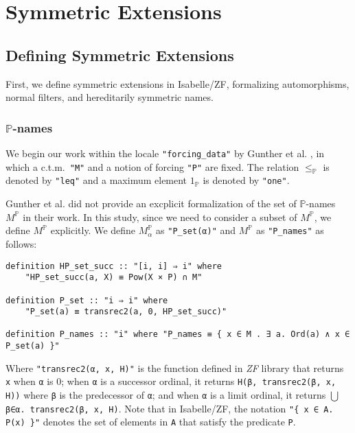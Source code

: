 \documentclass{report}
\newenvironment{isaframe}{\begin{mdframed}[topline=false, rightline=false, bottomline=false]}{\end{mdframed}}
\begin{document}
\section{Symmetric Extensions}

\subsection{Defining Symmetric Extensions}
First, we define symmetric extensions in Isabelle/ZF,
formalizing automorphisms, normal filters, and hereditarily symmetric names.

\subsubsection{$\mathbb{P}$-names}
We begin our work within the locale \texttt{"forcing\_data"} by Gunther et al. \cite{gunther_forcing}, 
in which a c.t.m.\  \texttt{"M"} and a notion of forcing \texttt{"P"} are fixed.
The relation $\leq_{\mathbb{P}}$ is denoted by \texttt{"leq"} and 
a maximum element $1_{\mathbb{P}}$ is denoted by \texttt{"one"}.

Gunther et al. did not provide an excplicit formalization of the set of $\mathbb{P}$-names $M^{\mathbb{P}}$ in their work.
In this study, since we need to consider a subset of $M^{\mathbb{P}}$, we define $M^{\mathbb{P}}$ explicitly.
We define $M^{\mathbb{P}}_{\alpha}$ as \texttt{"P\_set(α)"} and $M^{\mathbb{P}}$ as \texttt{"P\_names"} as follows:

\begin{isaframe}
\begin{verbatim}
definition HP_set_succ :: "[i, i] ⇒ i" where 
    "HP_set_succ(a, X) ≡ Pow(X × P) ∩ M" 

definition P_set :: "i ⇒ i" where 
    "P_set(a) ≡ transrec2(a, 0, HP_set_succ)" 

definition P_names :: "i" where "P_names ≡ { x ∈ M . ∃ a. Ord(a) ∧ x ∈ P_set(a) }" 
\end{verbatim}
\end{isaframe} 

Where \texttt{"transrec2(α, x, H)"} is the function defined in \emph{ZF} library
that returns \texttt{x} when \texttt{α} is 0;
when \texttt{α} is a successor ordinal, it returns \texttt{H(β, transrec2(β, x, H))} where \texttt{β} is the predecessor of \texttt{α};
and when \texttt{α} is a limit ordinal, it returns $\bigcup$\texttt{β∈α. transrec2(β, x, H)}.
Note that in Isabelle/ZF, the notation \texttt{"\{ x ∈ A. P(x) \}"} denotes
the set of elements in \texttt{A} that satisfy the predicate \texttt{P}.
\end{document}
